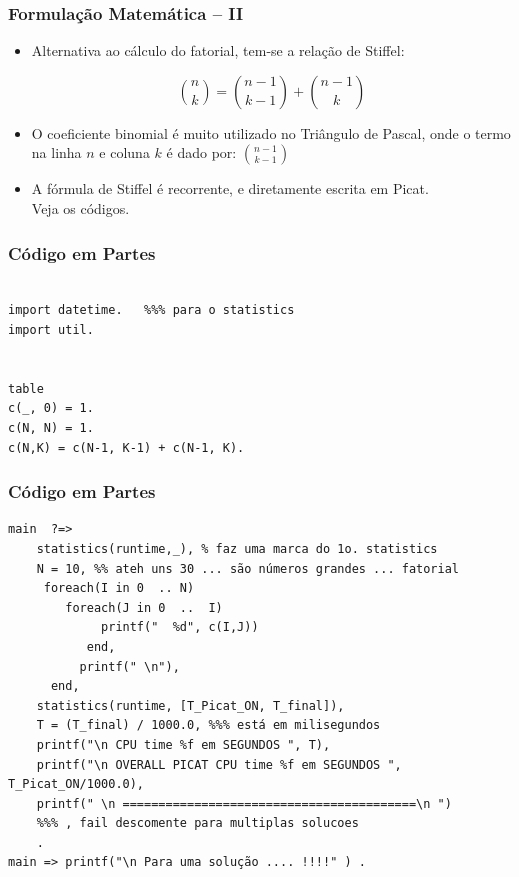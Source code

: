 \begin{frame}[fragile]

\frametitle{Formulação Matemática -- II}

\begin{itemize}
  \item Alternativa ao cálculo do fatorial, tem-se a relação de Stiffel:

$$ {n\choose k}={n-1\choose k-1}+{n-1\choose k}$$
    

\pause
  \item  O coeficiente binomial é muito utilizado no Triângulo de Pascal, onde o 
  termo na linha $n$ e coluna $k$ é  dado por: ${n-1 \choose k-1}$
  
  \pause
  \item A fórmula de Stiffel é recorrente, e diretamente escrita em Picat.\\
  Veja os códigos.
\end{itemize}   
    
\end{frame}




\begin{frame}[fragile] 

\frametitle{Código em Partes}

\begin{verbatim}

import datetime.   %%% para o statistics
import util.


table
c(_, 0) = 1.
c(N, N) = 1.
c(N,K) = c(N-1, K-1) + c(N-1, K).

\end{verbatim}
    
\end{frame}



\begin{frame}[fragile] 
\frametitle{Código em Partes}

\begin{footnotesize}
\begin{verbatim}
main  ?=>  
    statistics(runtime,_), % faz uma marca do 1o. statistics
    N = 10, %% ateh uns 30 ... são números grandes ... fatorial
     foreach(I in 0  .. N)
        foreach(J in 0  ..  I)
             printf("  %d", c(I,J))
           end,
          printf(" \n"),
      end, 
    statistics(runtime, [T_Picat_ON, T_final]),
    T = (T_final) / 1000.0, %%% está em milisegundos
    printf("\n CPU time %f em SEGUNDOS ", T),
    printf("\n OVERALL PICAT CPU time %f em SEGUNDOS ", T_Picat_ON/1000.0),
    printf(" \n =========================================\n ")
    %%% , fail descomente para multiplas solucoes
    .
main => printf("\n Para uma solução .... !!!!" ) .
\end{verbatim}
\end{footnotesize}
    
\end{frame}


